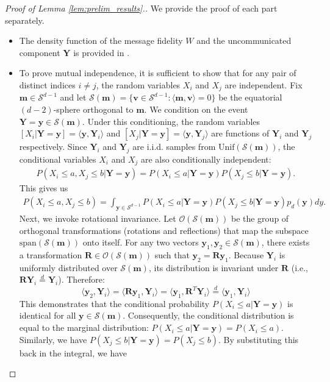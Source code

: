 \documentclass[12pt]{article}
\theoremstyle{definition}
\theoremstyle{remark}
\begin{document}
\begin{proof}[Proof of Lemma \ref{lem:prelim_results}.]
We provide the proof of each part separately.
\begin{itemize}
    \item[(i)] The density function of the message fidelity $W$ and the uncommunicated component $\mathbf{Y}$ is provided in \cite[Chapter 9.3]{mardia2009directional}.
    \item[(ii)]  To prove mutual independence, it is sufficient to show that for any pair of distinct indices $i \neq j$, the random variables $X_i$ and $X_j$ are independent. Fix $\mathbf{m} \in \mathcal{S}^{d-1}$ and let $\mathcal{S}(\mathbf{m}) = \{ \mathbf{v} \in \mathcal{S}^{d-1} : \langle \mathbf{m}, \mathbf{v} \rangle = 0 \}$ be the equatorial $(d-2)$-sphere orthogonal to $\mathbf{m}$. We condition on the event $\mathbf{Y} = \mathbf{y} \in \mathcal{S}(\mathbf{m})$. Under this conditioning, the random variables $[X_i | \mathbf{Y}=\mathbf{y}] = \langle \mathbf{y}, \mathbf{Y}_i \rangle$ and $[X_j | \mathbf{Y}=\mathbf{y}] = \langle \mathbf{y}, \mathbf{Y}_j \rangle$ are functions of $\mathbf{Y}_i$ and $\mathbf{Y}_j$ respectively. Since $\mathbf{Y}_i$ and $\mathbf{Y}_j$ are i.i.d. samples from $\text{Unif}(\mathcal{S}(\mathbf{m}))$, the conditional variables $X_i$ and $X_j$ are also conditionally independent:
    \begin{align*}
    P(X_i \le a, X_j \le b | \mathbf{Y}=\mathbf{y}) = P(X_i \le a | \mathbf{Y}=\mathbf{y}) P(X_j \le b | \mathbf{Y}=\mathbf{y}).
    \end{align*}
    This gives us
    \begin{align*}
    P(X_i \le a, X_j \le b) = \int_{\mathbf{y} \in \mathcal{S}^{d-1}} P(X_i \le a | \mathbf{Y}=\mathbf{y}) P(X_j \le b | \mathbf{Y}=\mathbf{y}) p_d(\mathbf{y})   dy.
    \end{align*}
    Next, we invoke rotational invariance. Let $\mathcal{O}(\mathcal{S}(\mathbf{m}))$ be the group of orthogonal transformations (rotations and reflections) that map the subspace $\text{span}(\mathcal{S}(\mathbf{m}))$ onto itself. For any two vectors $\mathbf{y}_1, \mathbf{y}_2 \in \mathcal{S}(\mathbf{m})$, there exists a transformation $\mathbf{R} \in \mathcal{O}(\mathcal{S}(\mathbf{m}))$ such that $\mathbf{y}_2 = \mathbf{R} \mathbf{y}_1$. Because $\mathbf{Y}_i$ is uniformly distributed over $\mathcal{S}(\mathbf{m})$, its distribution is invariant under $\mathbf{R}$ (i.e., $\mathbf{R}\mathbf{Y}_i \overset{d}{=} \mathbf{Y}_i$). Therefore:$$\langle \mathbf{y}_2, \mathbf{Y}_i \rangle = \langle \mathbf{R} \mathbf{y}_1, \mathbf{Y}_i \rangle = \langle \mathbf{y}_1, \mathbf{R}^T \mathbf{Y}_i \rangle \overset{d}{=} \langle \mathbf{y}_1, \mathbf{Y}_i \rangle$$This demonstrates that the conditional probability $P(X_i \le a | \mathbf{Y}=\mathbf{y})$ is identical for all $\mathbf{y} \in \mathcal{S}(\mathbf{m})$. Consequently, the conditional distribution is equal to the marginal distribution: $P(X_i \le a | \mathbf{Y}=\mathbf{y}) = P(X_i \le a)$. Similarly, we have $P(X_j \le b | \mathbf{Y}=\mathbf{y})  = P(X_j \le b)$. By substituting this back in the integral, we have

\end{itemize}
\end{proof}
\end{document}
